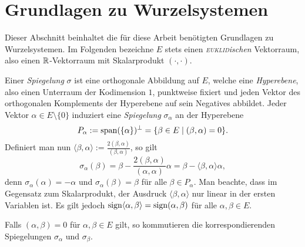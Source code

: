 \section{Grundlagen zu Wurzelsystemen}
\label{sec:grundlagen}

Dieser Abschnitt beinhaltet die für diese Arbeit benötigten Grundlagen zu Wurzelsystemen.  
Im Folgenden bezeichne $E$ stets einen \emph{\textsc{euklid}ischen} Vektorraum, also einen $\mathbb{R}$\hyp{}Vektorraum mit Skalarprodukt $(\cdot,\cdot)$.

Einer \emph{Spiegelung} $\sigma$ ist eine orthogonale Abbildung auf $E$, welche eine \emph{Hyperebene}, also einen Unterraum der Kodimension $1$, punktweise fixiert und jeden Vektor des orthogonalen Komplements der Hyperebene auf sein Negatives abbildet.
Jeder Vektor $\alpha \in E \setminus \{0\}$ induziert eine \emph{Spiegelung} $\sigma_\alpha$ an der Hyperebene 
\begin{displaymath}
  P_\alpha := \operatorname{span}(\{\alpha\})^\perp = \{\beta \in E \mid (\beta, \alpha) = 0\}.
\end{displaymath}
Definiert man nun $\langle \beta, \alpha \rangle := \tfrac{2 (\beta, \alpha)}{(\beta, \alpha)}$, so gilt
\begin{displaymath}
  \sigma_\alpha(\beta) 
  = \beta - \frac{2 (\beta, \alpha)}{(\alpha,\alpha)} \alpha 
  = \beta - \langle \beta, \alpha \rangle \alpha,
\end{displaymath}
denn $\sigma_\alpha(\alpha) = -\alpha$ und $\sigma_\alpha(\beta) = \beta$ für alle $\beta \in P_\alpha$.
Man beachte, dass im Gegensatz zum Skalarprodukt, der Ausdruck $\langle \beta, \alpha \rangle$ nur linear in der ersten Variablen ist.
Es gilt jedoch $\operatorname{sign} \langle \alpha, \beta \rangle = \operatorname{sign} (\alpha, \beta)$ für alle $\alpha, \beta \in E$.

\begin{lem}
  \label{lem:orthogonalRoots}
  Falls $(\alpha, \beta) = 0$ für $\alpha, \beta \in E$ gilt, so kommutieren die korrespondierenden Spiegelungen $\sigma_\alpha$ und $\sigma_\beta$.
\end{lem}

